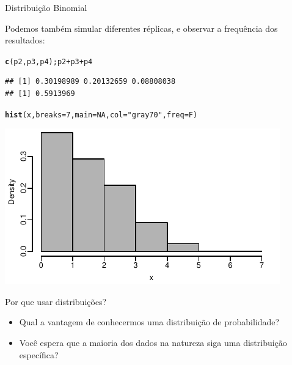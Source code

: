 \documentclass{beamer}\usepackage[]{graphicx}\usepackage[]{color}
\makeatletter
\def\maxwidth{ %
  \ifdim\Gin@nat@width>\linewidth
    \linewidth
  \else
    \Gin@nat@width
  \fi
}
\newcommand{\hlnum}[1]{\textcolor[rgb]{0.686,0.059,0.569}{#1}}%
\newcommand{\hlstr}[1]{\textcolor[rgb]{0.192,0.494,0.8}{#1}}%
\newcommand{\hlopt}[1]{\textcolor[rgb]{0,0,0}{#1}}%
\newcommand{\hlstd}[1]{\textcolor[rgb]{0.345,0.345,0.345}{#1}}%
\newcommand{\hlkwc}[1]{\textcolor[rgb]{0.333,0.667,0.333}{#1}}%
\newcommand{\hlkwd}[1]{\textcolor[rgb]{0.737,0.353,0.396}{\textbf{#1}}}%
\newenvironment{kframe}{%
 \def\at@end@of@kframe{}%
 \ifinner\ifhmode%
  \def\at@end@of@kframe{\end{minipage}}%
  \begin{minipage}{\columnwidth}%
 \fi\fi%
 \def\FrameCommand##1{\hskip\@totalleftmargin \hskip-\fboxsep
 \colorbox{shadecolor}{##1}\hskip-\fboxsep
     \hskip-\linewidth \hskip-\@totalleftmargin \hskip\columnwidth}%
 \MakeFramed {\advance\hsize-\width
   \@totalleftmargin\z@ \linewidth\hsize
   \@setminipage}}%
 {\par\unskip\endMakeFramed%
 \at@end@of@kframe}
\newenvironment{knitrout}{}{} %
\renewenvironment{knitrout}{\setlength{\topsep}{0mm}}{}
\makeatother
\begin{document}
\begin{frame}[fragile]{Distribuição Binomial}

\small{Podemos também simular diferentes réplicas, e observar a frequência dos resultados:}


\begin{knitrout}\tiny
{}\color{fgcolor}\begin{kframe}
\begin{alltt}
\hlkwd{c}\hlstd{(p2,p3,p4); p2} \hlopt{+} \hlstd{p3} \hlopt{+} \hlstd{p4}
\end{alltt}
\begin{verbatim}
## [1] 0.30198989 0.20132659 0.08808038
## [1] 0.5913969
\end{verbatim}
\begin{alltt}
\hlkwd{hist}\hlstd{(x,}\hlkwc{breaks}\hlstd{=}\hlnum{7}\hlstd{,}\hlkwc{main}\hlstd{=}\hlnum{NA}\hlstd{,}\hlkwc{col}\hlstd{=}\hlstr{"gray70"}\hlstd{,}\hlkwc{freq}\hlstd{=F)}
\end{alltt}
\end{kframe}
\includegraphics[width=\maxwidth]{figure/binom_freq2-1} 

\end{knitrout}

\end{frame} 

\begin{frame}{Por que usar distribuições?}

\begin{itemize}
  \item Qual a vantagem de conhecermos uma distribuição de probabilidade?
  
\vfill

  \item Você espera que a maioria dos dados na natureza siga uma distribuição específica?
  
\vfill


\end{itemize}

\end{frame} 
\end{document}

